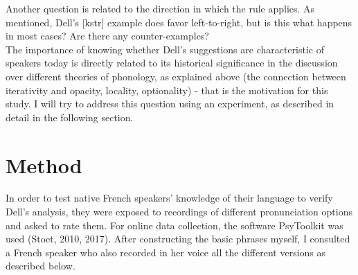 \documentclass{article}
\begin{document}
Another question is related to the direction in which the rule applies. As mentioned,  Dell's [kstr] example does favor left-to-right, but is this what happens in most cases? Are there any counter-examples?\\

The importance of knowing whether Dell's suggestions are characteristic of speakers today is directly related to its historical significance in the discussion over different theories of phonology,  as explained above (the connection between iterativity and opacity, locality, optionality) - that is the motivation for this study. I will try to address this question using an experiment, as described in detail in the following section.


\clearpage
\section{Method} %
In order to test native French speakers' knowledge of their language to verify Dell's analysis, they were exposed to recordings of different pronunciation options and asked to rate them.  For online data collection,  the software PsyToolkit was used (Stoet, 2010, 2017). After constructing the basic phrases myself, I consulted a French speaker who also recorded in her voice all the different versions as described below. 


\end{document}
